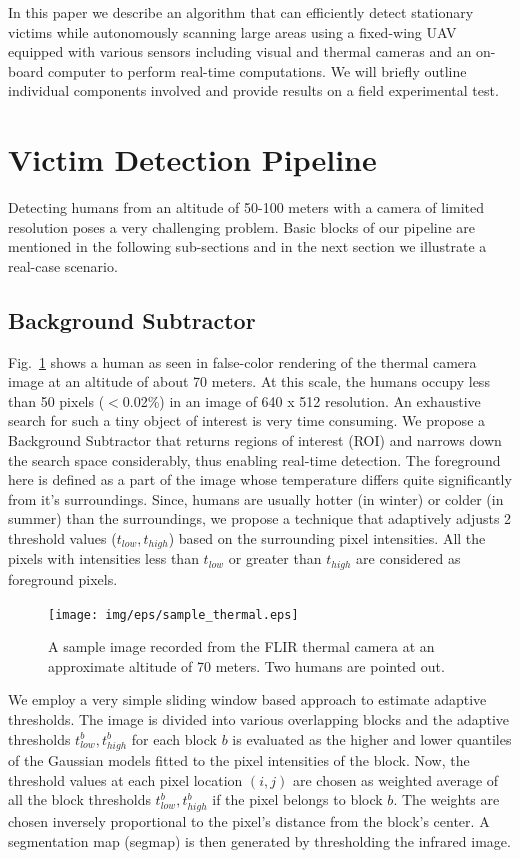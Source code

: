 \documentclass[runningheads]{llncs}
\begin{document}
In this paper we describe an algorithm that can efficiently detect stationary victims while autonomously scanning large areas using a fixed-wing UAV equipped with various sensors including visual and thermal cameras and an on-board computer to perform real-time computations. We will briefly outline individual components involved and provide results on a field experimental test.

\section{Victim Detection Pipeline}
Detecting humans from an altitude of 50-100 meters with a camera of limited resolution poses a very challenging problem. Basic blocks of our pipeline are mentioned in the following sub-sections and in the next section we illustrate a real-case scenario.

\subsection{Background Subtractor}
Fig.~\ref{fig:thermal_sample} shows a human as seen in false-color rendering of the thermal camera image at an altitude of about 70 meters. At this scale, the humans occupy less than 50 pixels ($<$0.02\%) in an image of 640 x 512 resolution. An exhaustive search for such a tiny object of interest is very time consuming. We propose a Background Subtractor that returns regions of interest (ROI) and narrows down the search space considerably, thus enabling real-time detection. The foreground here is defined as a part of the image whose temperature differs quite significantly from it's surroundings. Since, humans are usually hotter (in winter) or colder (in summer) than the surroundings, we propose a technique that adaptively adjusts 2 threshold values ($t_{low}, t_{high}$) based on the surrounding pixel intensities. All the pixels with intensities less than $t_{low}$ or greater than $t_{high}$ are considered as foreground pixels.

\begin{figure}
\centerline{\texttt{[image: img/eps/sample\_thermal.eps]}}
\caption{A sample image recorded from the FLIR thermal camera at an approximate altitude of 70 meters. Two humans are pointed out.}
\label{fig:thermal_sample}
\end{figure}

We employ a very simple sliding window based approach to estimate adaptive thresholds. The image is divided into various overlapping blocks and the adaptive thresholds $t_{low}^b, t_{high}^b$ for each block $b$ is evaluated as the higher and lower quantiles of the Gaussian models fitted to the pixel intensities of the block. Now, the threshold values at each pixel location $(i, j)$ are chosen as weighted average of all the block thresholds $t_{low}^b, t_{high}^b$ if the pixel belongs to block $b$. The weights are chosen inversely proportional to the pixel's distance from the block's center. A segmentation map (segmap) is then generated by thresholding the infrared image.
\end{document}
